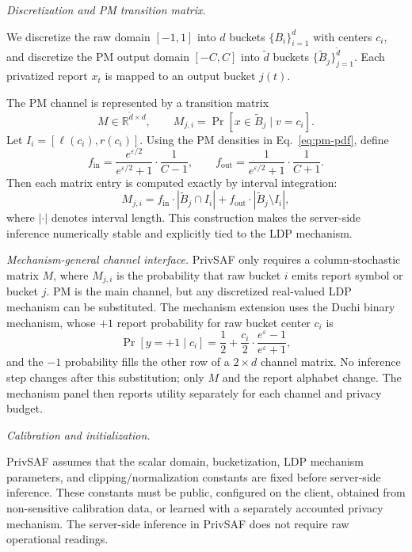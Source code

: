 \documentclass[conference]{IEEEtran}
\begin{document}
\noindent\emph{Discretization and PM transition matrix.}
\label{sec:discretization}

We discretize the raw domain \([-1,1]\) into \(d\) buckets \(\{B_i\}_{i=1}^{d}\) with centers \(c_i\), and discretize the PM output domain \([-C,C]\) into \(\tilde d\) buckets \(\{\tilde B_j\}_{j=1}^{\tilde d}\). Each privatized report \(x_t\) is mapped to an output bucket \(j(t)\).

The PM channel is represented by a transition matrix
\[
M\in\mathbb{R}^{\tilde d\times d},
\qquad
M_{j,i}=\Pr[x\in\tilde B_j\mid v=c_i].
\]
Let \(I_i=[\ell(c_i),r(c_i)]\). Using the PM densities in Eq.~\eqref{eq:pm-pdf}, define
\[
f_{\mathrm{in}}=
\frac{e^{\varepsilon/2}}{e^{\varepsilon/2}+1}\cdot \frac{1}{C-1},
\qquad
f_{\mathrm{out}}=
\frac{1}{e^{\varepsilon/2}+1}\cdot \frac{1}{C+1}.
\]
Then each matrix entry is computed exactly by interval integration:
\begin{equation}
M_{j,i}
=
f_{\mathrm{in}}\cdot |\tilde B_j\cap I_i|
+
f_{\mathrm{out}}\cdot |\tilde B_j\setminus I_i|,
\label{eq:transition}
\end{equation}
where \(|\cdot|\) denotes interval length. This construction makes the server-side inference numerically stable and explicitly tied to the LDP mechanism.

\noindent\emph{Mechanism-general channel interface.}
PrivSAF only requires a column-stochastic matrix \(M\), where \(M_{j,i}\) is the probability that raw bucket \(i\) emits report symbol or bucket \(j\). PM is the main channel, but any discretized real-valued LDP mechanism can be substituted. The mechanism extension uses the Duchi binary mechanism, whose \(+1\) report probability for raw bucket center \(c_i\) is
\[
\Pr[y=+1\mid c_i]
=
\frac{1}{2}
+
\frac{c_i}{2}\cdot\frac{e^\varepsilon-1}{e^\varepsilon+1},
\]
and the \(-1\) probability fills the other row of a \(2\times d\) channel matrix. No inference step changes after this substitution; only \(M\) and the report alphabet change. The mechanism panel then reports utility separately for each channel and privacy budget.

\noindent\emph{Calibration and initialization.}
\label{sec:calibration}

PrivSAF assumes that the scalar domain, bucketization, LDP mechanism parameters, and clipping/normalization constants are fixed before server-side inference. These constants must be public, configured on the client, obtained from non-sensitive calibration data, or learned with a separately accounted privacy mechanism. The server-side inference in PrivSAF does not require raw operational readings.
\end{document}
